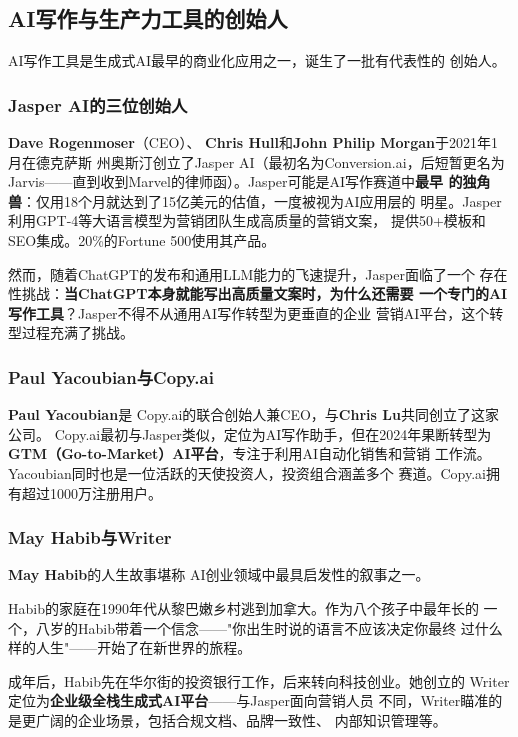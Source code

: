 \subsection{AI写作与生产力工具的创始人}
\label{subsec:founders-writing}

AI写作工具是生成式AI最早的商业化应用之一，诞生了一批有代表性的
创始人。

\subsubsection{Jasper AI的三位创始人} \textbf{Dave Rogenmoser}（CEO）、
\textbf{Chris Hull}和\textbf{John Philip Morgan}于2021年1月在德克萨斯
州奥斯汀创立了Jasper AI（最初名为Conversion.ai，后短暂更名为
Jarvis——直到收到Marvel的律师函）。Jasper可能是AI写作赛道中\textbf{最早
的独角兽}：仅用18个月就达到了15亿美元的估值，一度被视为AI应用层的
明星。Jasper利用GPT-4等大语言模型为营销团队生成高质量的营销文案，
提供50+模板和SEO集成。20\%的Fortune 500使用其产品。

然而，随着ChatGPT的发布和通用LLM能力的飞速提升，Jasper面临了一个
存在性挑战：\textbf{当ChatGPT本身就能写出高质量文案时，为什么还需要
一个专门的AI写作工具}？Jasper不得不从通用AI写作转型为更垂直的企业
营销AI平台，这个转型过程充满了挑战。

\subsubsection{Paul Yacoubian与Copy.ai} \textbf{Paul Yacoubian}是
Copy.ai的联合创始人兼CEO，与\textbf{Chris Lu}共同创立了这家公司。
Copy.ai最初与Jasper类似，定位为AI写作助手，但在2024年果断转型为
\textbf{GTM（Go-to-Market）AI平台}，专注于利用AI自动化销售和营销
工作流。Yacoubian同时也是一位活跃的天使投资人，投资组合涵盖多个
赛道。Copy.ai拥有超过1000万注册用户。

\subsubsection{May Habib与Writer} \textbf{May Habib}的人生故事堪称
AI创业领域中最具启发性的叙事之一。

Habib的家庭在1990年代从黎巴嫩乡村逃到加拿大。作为八个孩子中最年长的
一个，八岁的Habib带着一个信念——"你出生时说的语言不应该决定你最终
过什么样的人生"——开始了在新世界的旅程。

成年后，Habib先在华尔街的投资银行工作，后来转向科技创业。她创立的
Writer定位为\textbf{企业级全栈生成式AI平台}——与Jasper面向营销人员
不同，Writer瞄准的是更广阔的企业场景，包括合规文档、品牌一致性、
内部知识管理等。

